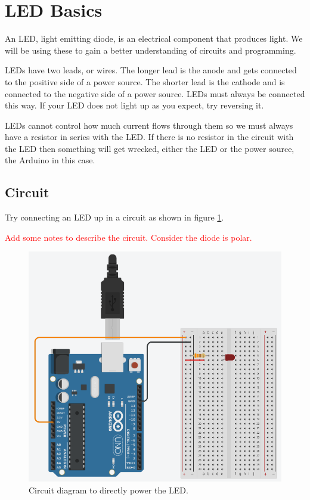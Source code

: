 \documentclass[12pt]{article}
\begin{document}
	\section{LED Basics}
	
	An LED, light emitting diode, is an electrical component that produces light. We will be using these to gain a better understanding of circuits and programming.
	
	LEDs have two leads, or wires. The longer lead is the anode and gets connected to the positive side of a power source. The shorter lead is the cathode and is connected to the negative side of a power source. LEDs must always be connected this way. If your LED does not light up as you expect, try reversing it.
	
	LEDs cannot control how much current flows through them so we must always have a resistor in series with the LED. If there is no resistor in the circuit with the LED then something will get wrecked, either the LED or the power source, the Arduino in this case.
	
	\subsection{Circuit}
	
	Try connecting an LED up in a circuit as shown in figure \ref{fig:circuit_simple}.
	
	\textcolor{red}{Add some notes to describe the circuit. Consider the diode is polar.}
	
	\begin{figure}[H]
		\begin{center}
			\includegraphics[scale=0.5]{LED_simple}
			\caption{Circuit diagram to directly power the LED.}
			\label{fig:circuit_simple}
		\end{center}
	\end{figure}
\end{document}
